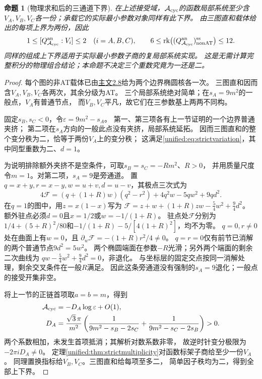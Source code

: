 \documentclass[11pt,a4paper,oneside]{ctexart}
\theoremstyle{cnplain}
\newtheorem{proposition}[theorem]{命题}
\theoremstyle{definition}
\theoremstyle{remark}
\numberwithin{equation}{section}
\newcommand{\otherref}[2]{\href{#1.pdf}{#2}}
\begin{document}
\begin{proposition}[物理求和后的三通道下界]\label{unified:prop:cyclicice}
在上述接受域，$\mathcal A_{\rm cyc}$的函数局部系统至少含
$V_A,V_B,V_C$各一份；承载它的实际最小参数对象同样有此下界。
由三图直和载体给出的每项上界为两份，因此
\[
 1\leq[Q_{\mathcal A_{\rm cyc}}^{\rm an}:V_i]\leq2\quad(i=A,B,C),
 \qquad
 6\leq\operatorname{rk}\bigl((Q_{\mathcal A_{\rm cyc}}^{\rm an})_{\rm nonAT}^{\rm ss}\bigr)
      \leq12.
\]
同样的组成上下界适用于实际最小参数子商的复局部系统实现。
这是无需计算完整积分的物理组合结论；本命题不决定三个重数究竟为一还是二。
\end{proposition}
\begin{proof}
每个图的非AT载体已由\otherref{feynman_periods_long_paper}{主文2.8}给为两个边界椭圆核各一次。
三图直和因而含$V_A,V_B,V_C$各两次，其余分级为AT。
三个局部系统绝对简单；在$s_A=9m^2$的一般点，$V_A$有普通节点，
而$V_B,V_C$平凡，故它们在三参数基上两两不同构。

固定$s_B,s_C<0$，令$\varepsilon=9m^2-s_A$。
第一、第三项各有上一节证明的一个边界普通夹挤；
第二项在$s_A$方向的一般此点没有夹挤，局部系统延拓。
因而三图直和的整个变分秩为二，恰等于两份$V_A$上的变分秩；
这满足\eqref{unified:eq:strictvariation}，其中同型重数为二、$d=1$。

为说明排除额外夹挤不是空条件，可取$s_B=s_C=-Rm^2$、$R>0$，
并用质量尺度令$m=1$。对第二项，$s_A=9$是旁通道。
置$q=x+y,r=x-y,w=u+v,d=u-v$，其极点三次式为
\[
 4\mathcal F=(q+(1+R)w)(q^2-r^2)+4q^2w-5qw^2+9qd^2.
\]
在$q=1$的图中，用$z=x(1-x)$写为
$\mathcal F=z+w+(1+R)zw-\frac54w^2+\frac94d^2$。
额外驻点必须$d=0$且$x=1/2$或$w=-1/(1+R)$。
驻点处$\mathcal F$分别为
$1/4+(5+R)^2/80$和$-1/(1+R)-5/[4(1+R)^2]$，均不为零。
$q=0,r\ne0$处在曲面上有$w=0$，且
$\partial_w\mathcal F=-(1+R)r^2/4\ne0$。
$q=r=0$仅有前节已消解的两个普通节点$9d^2=5w^2$。
两个椭圆端面在参数$-R$光滑；另外两个端面的剩余二次曲线为
$qw-\frac54w^2+\frac94d^2=0$，非退化。
与坐标层的固定交点按同一消解处理，剩余交叉条件在一般$R$满足。
因此这条旁通道没有强制的$s_A=9$退化；一般点的接受开集非空。

将上一节的正链首项取$a=b=m$，得到
\begin{align*}
 \mathcal A_{\rm cyc}
   &=-D_A\log\varepsilon+O(1),\\
 D_A&=\frac{\sqrt3\,\pi}{m^2}
       \left(\frac1{9m^2-s_B-2s_C}
             +\frac1{9m^2-s_C-2s_B}\right)>0 .
\end{align*}
两个系数相加，未发生首项抵消；其解析对数系数非零，
故逆时针变分极限为$-2\pi iD_A\ne0$。
定理\ref{unified:thm:strictmultiplicity}对函数标架子商给至少一份$V_A$。
同理置换指标给$V_B,V_C$。三图直和给每项至多二，
简单因子秩均为二，得到全部上下界。
\end{proof}
\end{document}
